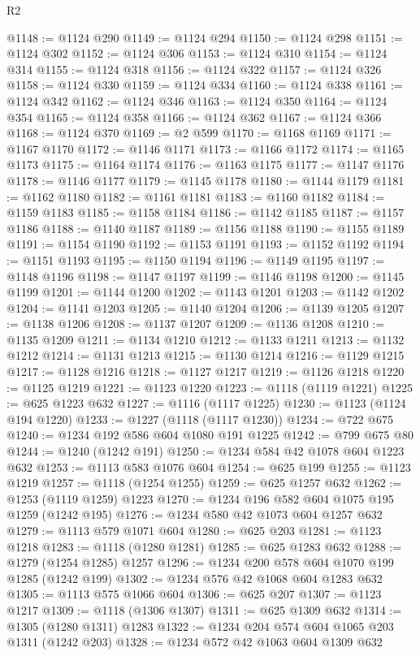 \begin{lexlean}{R2}
\begin{coremodule}
@1148 := @1124 @290
@1149 := @1124 @294
@1150 := @1124 @298
@1151 := @1124 @302
@1152 := @1124 @306
@1153 := @1124 @310
@1154 := @1124 @314
@1155 := @1124 @318
@1156 := @1124 @322
@1157 := @1124 @326
@1158 := @1124 @330
@1159 := @1124 @334
@1160 := @1124 @338
@1161 := @1124 @342
@1162 := @1124 @346
@1163 := @1124 @350
@1164 := @1124 @354
@1165 := @1124 @358
@1166 := @1124 @362
@1167 := @1124 @366
@1168 := @1124 @370
@1169 := @2 @599
@1170 := @1168 @1169
@1171 := @1167 @1170
@1172 := @1146 @1171
@1173 := @1166 @1172
@1174 := @1165 @1173
@1175 := @1164 @1174
@1176 := @1163 @1175
@1177 := @1147 @1176
@1178 := @1146 @1177
@1179 := @1145 @1178
@1180 := @1144 @1179
@1181 := @1162 @1180
@1182 := @1161 @1181
@1183 := @1160 @1182
@1184 := @1159 @1183
@1185 := @1158 @1184
@1186 := @1142 @1185
@1187 := @1157 @1186
@1188 := @1140 @1187
@1189 := @1156 @1188
@1190 := @1155 @1189
@1191 := @1154 @1190
@1192 := @1153 @1191
@1193 := @1152 @1192
@1194 := @1151 @1193
@1195 := @1150 @1194
@1196 := @1149 @1195
@1197 := @1148 @1196
@1198 := @1147 @1197
@1199 := @1146 @1198
@1200 := @1145 @1199
@1201 := @1144 @1200
@1202 := @1143 @1201
@1203 := @1142 @1202
@1204 := @1141 @1203
@1205 := @1140 @1204
@1206 := @1139 @1205
@1207 := @1138 @1206
@1208 := @1137 @1207
@1209 := @1136 @1208
@1210 := @1135 @1209
@1211 := @1134 @1210
@1212 := @1133 @1211
@1213 := @1132 @1212
@1214 := @1131 @1213
@1215 := @1130 @1214
@1216 := @1129 @1215
@1217 := @1128 @1216
@1218 := @1127 @1217
@1219 := @1126 @1218
@1220 := @1125 @1219
@1221 := @1123 @1220
@1223 := @1118 (@1119 @1221)
@1225 := @625 @1223 @632
@1227 := @1116 (@1117 @1225)
@1230 := @1123 (@1124 @194 @1220)
@1233 := @1227 (@1118 (@1117 @1230))
@1234 := @722 @675
@1240 := @1234 @192 @586 @604 @1080 @191 @1225
@1242 := @799 @675 @80
@1244 := @1240 (@1242 @191)
@1250 := @1234 @584 @42 @1078 @604 @1223 @632
@1253 := @1113 @583 @1076 @604
@1254 := @625 @199
@1255 := @1123 @1219
@1257 := @1118 (@1254 @1255)
@1259 := @625 @1257 @632
@1262 := @1253 (@1119 @1259) @1223
@1270 := @1234 @196 @582 @604 @1075 @195 @1259 (@1242 @195)
@1276 := @1234 @580 @42 @1073 @604 @1257 @632
@1279 := @1113 @579 @1071 @604
@1280 := @625 @203
@1281 := @1123 @1218
@1283 := @1118 (@1280 @1281)
@1285 := @625 @1283 @632
@1288 := @1279 (@1254 @1285) @1257
@1296 := @1234 @200 @578 @604 @1070 @199 @1285 (@1242 @199)
@1302 := @1234 @576 @42 @1068 @604 @1283 @632
@1305 := @1113 @575 @1066 @604
@1306 := @625 @207
@1307 := @1123 @1217
@1309 := @1118 (@1306 @1307)
@1311 := @625 @1309 @632
@1314 := @1305 (@1280 @1311) @1283
@1322 := @1234 @204 @574 @604 @1065 @203 @1311 (@1242 @203)
@1328 := @1234 @572 @42 @1063 @604 @1309 @632

\end{coremodule}
\end{lexlean}
